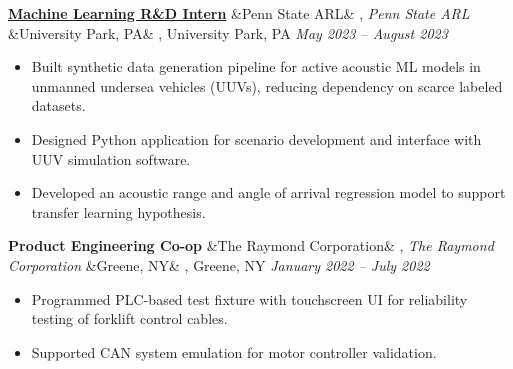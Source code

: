 \documentclass[letterpaper,10pt]{article}
\newcommand{\experience}[5]{%
    \noindent\textbf{#1}%
    \ifx&#2&
    \else
        , \textit{#2}%
    \fi
    \ifx&#3&
    \else
        , #3%
    \fi
    \hfill \textit{#4} \\
    \vspace{-6.8mm}%
    \begin{itemize}[itemsep=-5pt]
        \setlength{\itemindent}{0em}
        #5
    \end{itemize}
    \vspace{1mm}
}
\begin{document}
\experience
    {\href{https://ryanbarry.me/projects/ai-ml/sonar-data-pipeline/}{Machine Learning R\&D Intern}}
    {Penn State ARL}
    {University Park, PA}
    {May 2023 – August 2023}
    {
        \item Built synthetic data generation pipeline for active acoustic ML models in unmanned undersea vehicles (UUVs), reducing dependency on scarce labeled datasets.
        \item Designed Python application for scenario development and interface with UUV simulation software.
        \item Developed an acoustic range and angle of arrival regression model to support transfer learning hypothesis.
    }

\experience
    {Product Engineering Co-op}
    {The Raymond Corporation}
    {Greene, NY}
    {January 2022 – July 2022}
    {
        \item Programmed PLC-based test fixture with touchscreen UI for reliability testing of forklift control cables.
        
        \item Supported CAN system emulation for motor controller validation.


    }

        

    
\end{document}

